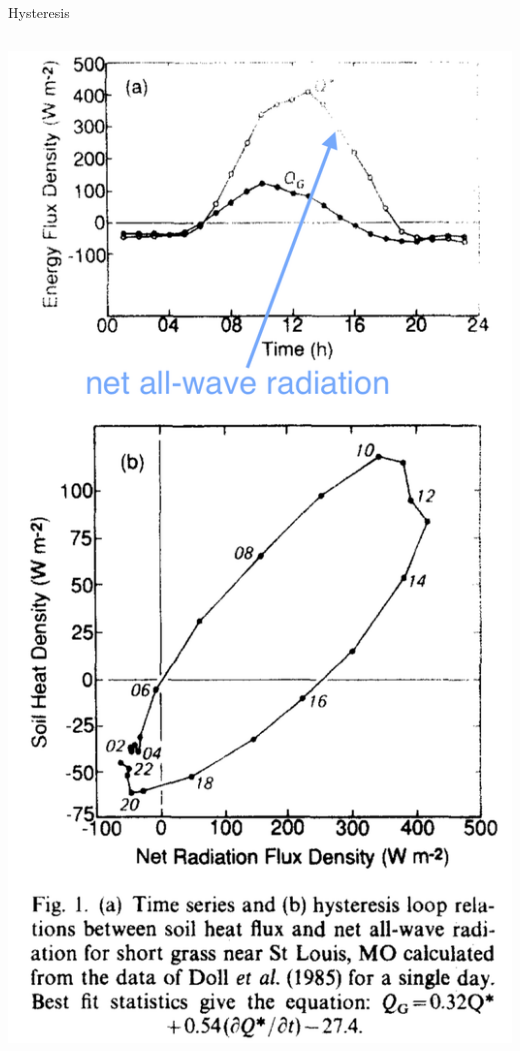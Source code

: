 \begin{frame}{Hysteresis}
\begin{columns}[T]
    \begin{column}{.35\textwidth}
    \begin{minipage}[c][0.8\textheight][c]{\linewidth}
    \includegraphics[width=1\textwidth]{fig12.png}

\end{minipage}
\end{column}
\end{columns}
\end{frame}
